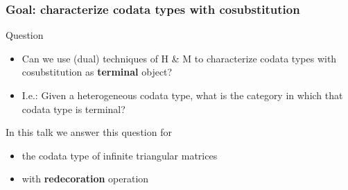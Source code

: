 \documentclass[
serif,
mathsans,
]
{beamer}
\newcommand{\fat}[1]{\textbf{#1}}
\begin{document}
\begin{frame}
 \frametitle{Goal: characterize \fat{co}data types with \fat{co}substitution}
 
\begin{block}{Question}
  \begin{itemize}
    \item 
        Can we use (dual) techniques of H \& M to characterize codata types with cosubstitution as
        \fat{terminal} object?
    \item I.e.: Given a heterogeneous codata type, what is the category in which that codata type is terminal?
  \end{itemize}
\end{block}
  
\begin{block}{In this talk}
 we answer this question for 
  \begin{itemize} 
    \item the codata type of infinite triangular matrices
    \item with \fat{redecoration} operation
  \end{itemize}
\end{block} 
\end{frame}


\begin{comment}
\begin{frame}
 \frametitle{Binding signatures with (in)equations}
   \begin{block}{Equational theories}
    \begin{itemize}
     \item prime example: lambda calculus modulo $\beta$-equivalence
     \item Fiore with students Hur \& Mahmoud
     \item Hirschowitz \& Maggesi 
    \end{itemize}
   \end{block}
   
  \begin{block}{Reduction rules via \fat{in}equations}
   \begin{itemize}
    \item A., PhD thesis: 
     \begin{itemize}
      \item based on ideas by Hirschowitz \& Maggesi
      \item uses notion of \fat{relative} monad (Altenkirch et al. '10)
     \end{itemize}
   \end{itemize}
  \end{block}
  
  \begin{block}{Goal:}
   do the same for cosyntax, i.e.\ \fat{nested co}data types 
  \end{block}
\end{frame}
\end{comment}
\end{document}
